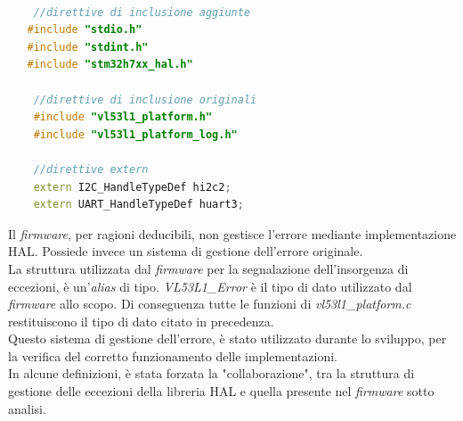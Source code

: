 \documentclass[11pt]{report}
\begin{document}
\begin{lstlisting}[language = Cpp, caption={\textit{path} delle direttive di inclusione di \textit{vl53l1\_platform.c}, in aggiunta la ridefinizione delle variabili di gestione della comunicazione}]

    //direttive di inclusione aggiunte
   #include "stdio.h"
   #include "stdint.h"
   #include "stm32h7xx_hal.h"
    
    //direttive di inclusione originali
    #include "vl53l1_platform.h"
    #include "vl53l1_platform_log.h"

    //direttive extern
    extern I2C_HandleTypeDef hi2c2;
    extern UART_HandleTypeDef huart3;

\end{lstlisting}

Il \textit{firmware}, per ragioni deducibili, non gestisce l'errore mediante implementazione HAL. Possiede invece un sistema di gestione dell'errore originale.\\
La struttura utilizzata dal \textit{firmware} per la segnalazione dell'insorgenza di eccezioni, è un'\textit{alias} di tipo.
\textit{VL53L1\_Error} è il tipo di dato utilizzato dal \textit{firmware} allo scopo. Di conseguenza tutte le funzioni di \textit{vl53l1\_platform.c} restituiscono il tipo di dato citato in precedenza.\\
Questo sistema di gestione dell'errore, è stato utilizzato durante lo sviluppo, per la verifica del corretto funzionamento delle implementazioni.\\
In alcune definizioni, è stata forzata la "collaborazione", tra la struttura di gestione delle eccezioni della libreria HAL e quella presente nel \textit{firmware} sotto analisi.
\end{document}
